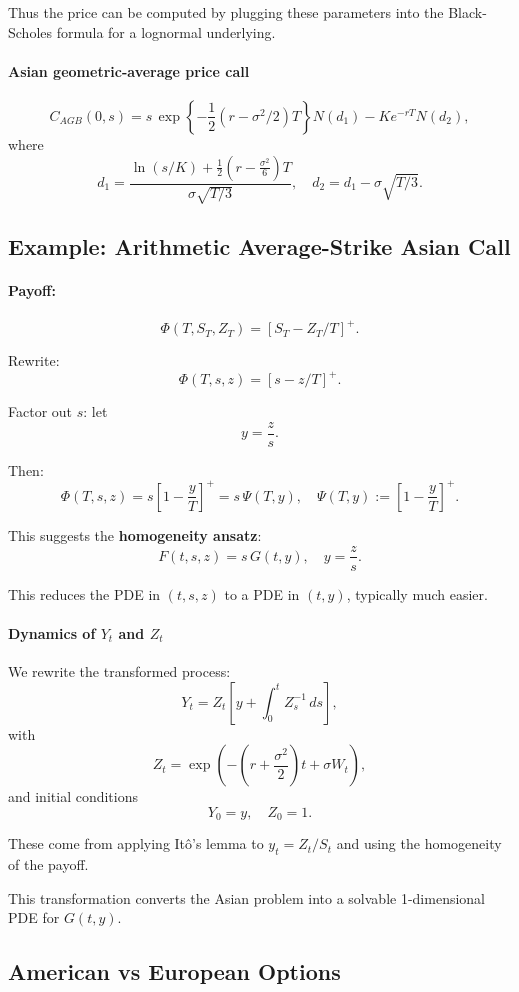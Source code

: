 \documentclass[12pt,a4paper]{article}
\theoremstyle{definition}
\begin{document}
Thus the price can be computed by plugging these parameters into the Black-Scholes formula for a lognormal underlying.

\paragraph{Asian geometric-average price call}
\[
C_{AGB}(0, s) = s\, \exp\!\left\{-\frac{1}{2}\left(r - \sigma^2/2\right)T\right\} N(d_1) - K e^{-rT} N(d_2),
\]
where
\[
d_1 = \frac{\ln(s/K) + \frac{1}{2}\left(r - \frac{\sigma^2}{6}\right)T}{\sigma\sqrt{T/3}}, \quad d_2 = d_1 - \sigma\sqrt{T/3}.
\]

\subsection{Example: Arithmetic Average-Strike Asian Call}

\paragraph{Payoff:}
\[
\Phi(T, S_T, Z_T) = [S_T - Z_T/T]^+.
\]

Rewrite:
\[
\Phi(T, s, z) = [s - z/T]^+.
\]

Factor out $s$: let
\[
y = \frac{z}{s}.
\]

Then:
\[
\Phi(T, s, z) = s\left[1 - \frac{y}{T}\right]^+ = s\, \Psi(T, y), \quad \Psi(T, y) := \left[1 - \frac{y}{T}\right]^+.
\]

This suggests the \textbf{homogeneity ansatz}:
\[
\boxed{
F(t, s, z) = s\, G(t, y), \quad y = \frac{z}{s}.
}
\]

This reduces the PDE in $(t, s, z)$ to a PDE in $(t, y)$, typically much easier.

\paragraph{Dynamics of $Y_t$ and $Z_t$}

We rewrite the transformed process:
\[
Y_t = Z_t\left[y + \int_0^t Z_s^{-1}\, ds\right],
\]
with
\[
Z_t = \exp\!\left(-\left(r + \frac{\sigma^2}{2}\right)t + \sigma W_t\right),
\]
and initial conditions
\[
Y_0 = y, \quad Z_0 = 1.
\]

These come from applying Itô's lemma to $y_t = Z_t/S_t$ and using the homogeneity of the payoff.

This transformation converts the Asian problem into a solvable 1-dimensional PDE for $G(t, y)$.

\subsection{American vs European Options}
\end{document}
